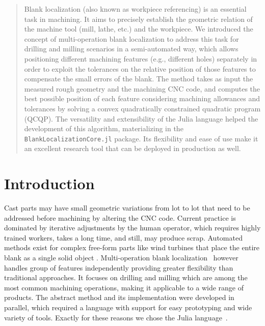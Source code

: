 \documentclass{juliacon}
\begin{document}


\maketitle

\begin{abstract}

Blank localization (also known as workpiece referencing) is an essential task in machining.
It aims to precisely establish the geometric relation of the machine tool (mill, lathe, etc.) and the workpiece.
We introduced the concept of multi-operation blank localization to address this task for drilling and milling scenarios in a semi-automated way,
which allows positioning different machining features (e.g., different holes) separately in order to exploit the tolerances on the relative position of those features to compensate the small errors of the blank.
The method takes as input the measured rough geometry and the machining CNC code, and computes the best possible position of each feature considering machining allowances and tolerances by solving a convex quadratically constrained quadratic program (QCQP).
The versatility and extensibility of the Julia language helped the development of this algorithm, materializing in the \texttt{BlankLocalizationCore.jl} package.
Its flexibility and ease of use make it an excellent research tool that can be deployed in production as well.
\end{abstract}

\section{Introduction}
\label{sec:intro}
Cast parts may have small geometric variations from lot to lot that need to be addressed before machining by altering the CNC code.
Current practice is dominated by iterative adjustments by the human operator, which requires highly trained workers, takes a long time, and still, may produce scrap.
Automated methods exist for complex free-form parts like wind turbines that place the entire blank as a single solid object \cite{ding:2021_CoarsefineOptimizationMethod}\cite{tan:2014_UnconstrainedApproachBlank}.
Multi-operation blank localization~\cite{cserteg:2023_Annals} however handles group of features independently providing greater flexibility than traditional approaches.
It focuses on drilling and milling which are among the most common machining operations, making it applicable to a wide range of products.
The abstract method and its implementation were developed in parallel, which required a language with support for easy prototyping and wide variety of tools.
Exactly for these reasons we chose the Julia language~\cite{bezanson2017julia}.
\end{document}

